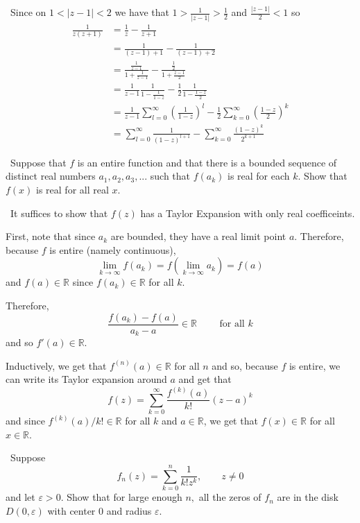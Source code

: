 \documentclass[12pt]{Homework}
\begin{document}
\begin{solution}$\,$
Since on $1<|z-1|<2$ we have that $1>\frac{1}{|z-1|}>\frac{1}{2}$ and $\frac{|z-1|}{2}<1$ so \begin{align*}
    \frac{1}{z(z+1)}&=\frac{1}{z}-\frac{1}{z+1}\\
    &=\frac{1}{(z-1)+1}-\frac{1}{(z-1)+2}\\
    &=\frac{\frac{1}{z-1}}{1+\frac{1}{z-1}}-\frac{\frac{1}{2}}{1+\frac{z-1}{2}}\\
    &=\frac{1}{z-1}\frac{1}{1-\frac{1}{1-z}}-\frac{1}{2}\frac{1}{1-\frac{1-z}{2}}\\
    &=\frac{1}{z-1}\sum_{l=0}^\infty\left(\frac{1}{1-z}\right)^l-\frac{1}{2}\sum_{k=0}^\infty\left(\frac{1-z}{2}\right)^k\\
    &=\sum_{l=0}^\infty\frac{1}{(1-z)^{l+1}}-\sum_{k=0}^\infty\frac{(1-z)^k}{2^{k+1}}
\end{align*}
\end{solution}
\newpage

\begin{problem} $\,$
Suppose that $f$ is an entire function and that there is a bounded sequence of distinct real numbers $a_1,a_2,a_3,...$ such that $f(a_k)$ is real for each $k.$ Show that $f(x)$ is real for all real $x.$
\end{problem}


\begin{solution}$\,$
It suffices to show that $f(z)$ has a Taylor Expansion with only real coefficeints. 

First, note that since $a_k$ are bounded, they have a real limit point $a$. Therefore, because $f$ is entire (namely continuous), $$\lim_{k\to\infty}f(a_k)=f\left(\lim_{k\to\infty}a_k\right)=f(a)$$ and $f(a)\in\mathbb{R}$ since $f(a_k)\in\mathbb{R}$ for all $k$.

Therefore, $$\frac{f(a_k)-f(a)}{a_k-a}\in\mathbb{R}\qquad\text{ for all }k$$ and so $f'(a)\in\mathbb{R}$.

Inductively, we get that $f^{(n)}(a)\in\mathbb{R}$ for all $n$ and so, because $f$ is entire, we can write its Taylor expansion around $a$ and get that $$f(z)=\sum_{k=0}^\infty\frac{f^{(k)}(a)}{k!}(z-a)^k$$ and since $f^{(k)}(a)/k!\in\mathbb{R}$ for all $k$ and $a\in\mathbb{R}$, we get that $f(x)\in\mathbb{R}$ for all $x\in\mathbb{R}$.
\end{solution}
\newpage





\begin{problem} $\,$
Suppose $$f_n(z)=\sum_{k=0}^n\frac{1}{k!z^k},\qquad z\not=0$$ and let $\varepsilon>0$. Show that for large enough $n,$ all the zeros of $f_n$ are in the disk $D(0,\varepsilon)$ with center $0$ and radius $\varepsilon.$
\end{problem}
\end{document}
